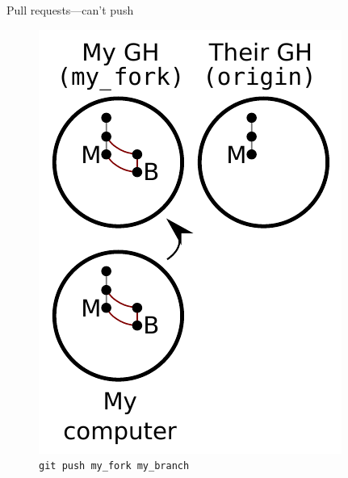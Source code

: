\begin{frame}{Pull requests---can't push}
  \begin{figure}
    \includegraphics{fork_010.pdf}
    \\ \texttt{git push my\_fork my\_branch}
    \\ \texttt{}
  \end{figure}
\end{frame}

